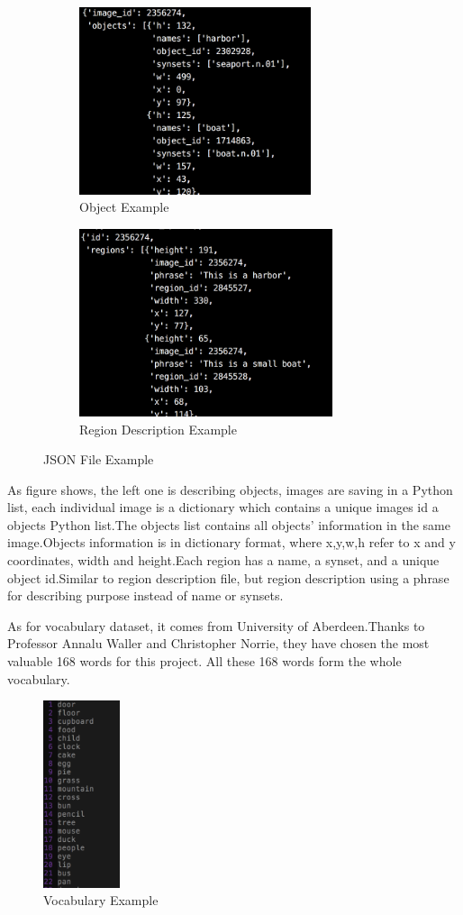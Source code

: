 \documentclass[12pt,a4paper]{report}
\begin{document}
\begin{figure}[h]
\begin{subfigure}{0.5\linewidth}
	\includegraphics[height=5.5cm,width=\textwidth]{object.png}
	\caption{Object Example}
\end{subfigure}
\begin{subfigure}{0.5\linewidth}
	\includegraphics[height=5.5cm,width=\textwidth]{region.png}
	\caption{Region Description Example}
\end{subfigure}
\label{dataset example}
\caption{JSON File Example}
\end{figure}
As figure shows, the left one is describing objects, images are saving in a Python list, each individual image is a dictionary which contains a unique images id a objects Python list.The objects list contains all objects' information in the same image.Objects information is in dictionary format, where x,y,w,h refer to x and y coordinates, width and height.Each region has a  name, a synset, and a unique object id.Similar to region description file, but region description using a phrase for describing purpose instead of name or synsets.


As for vocabulary dataset, it comes from University of Aberdeen.\cite{dataset}Thanks to Professor Annalu Waller and Christopher Norrie, they have chosen the most valuable 168  words for this project. All these 168 words form the whole vocabulary.
\begin{figure}[h]
\centering
\includegraphics[width=0.2\textwidth]{vocab.png}
\caption{Vocabulary Example}
\end{figure}
\end{document}
